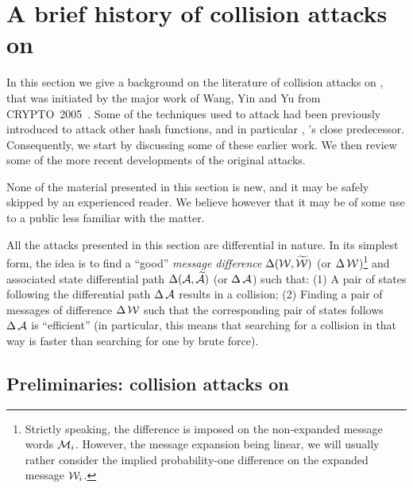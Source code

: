 \section{A brief history of collision attacks on \shaone}
\label{sec:history}

In this section we give a background on the literature of collision attacks on \shaone, that was initiated by the major work of Wang, Yin and Yu from CRYPTO~2005~\cite{DBLP:conf/crypto/WangYY05a}.
Some of the techniques used to attack \shaone had been previously introduced to attack other hash functions, and in particular \shazero, \shaone's close predecessor. Consequently, we start by
discussing some of these earlier work. We then review some of the more recent developments of the original attacks.

None of the material presented in this section is new, and it may be safely skipped by an experienced reader. We believe however that it may be of some use to a public less familiar with
the matter.

\medskip

All the attacks presented in this section are differential in nature. In its simplest form, the idea is to find a ``good'' \emph{message difference} $\operatorname{\Delta}(\mathcal{W},\mathcal{\widetilde W})$
(or $\operatorname{\Delta}\mathcal{W}$)\footnote{Strictly speaking, the difference is imposed on the non-expanded message words $\mathcal{M}_i$. However, the message expansion being linear,
we will usually rather consider the implied probability-one difference on the expanded message $\mathcal{W}_i$.}
and associated state differential path $\operatorname{\Delta}(\mathcal{A},\mathcal{\widetilde A})$ (or $\operatorname{\Delta}\mathcal{A}$) such that: (1) A pair of states following the differential path
$\operatorname{\Delta}\mathcal{A}$ results in a collision; (2) Finding a pair of messages of difference $\operatorname{\Delta}\mathcal{W}$ such that the corresponding pair of states follows $\operatorname{\Delta}\mathcal{A}$ is
``efficient'' (in particular, this means that searching for a collision in that way is faster than searching for one by brute force).


\subsection{Preliminaries: collision attacks on \shazero}


